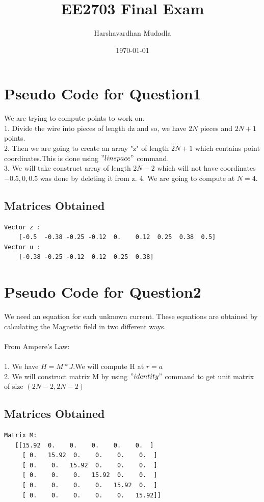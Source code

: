 \documentclass[11pt, a4paper]{article}
\title{EE2703 Final Exam} %
\author{Harshavardhan Mudadla} %
\date{\today} %
\begin{document}
		
		
\maketitle %
\section{Pseudo Code for Question1}
We are trying to compute points to work on.\\
1. Divide the wire into pieces of length dz and so, we have $2N$ pieces and $2N+1$ points.\\
2. Then we are going to create an array "z" of length $2N+1$ which contains point coordinates.This is done using $"linspace"$ command.\\
3. We will take construct array of length $2N-2$ which will not have coordinates $-0.5,0,0.5$ was done by deleting it from z. 
4. We are going to compute at $N = 4$.

\subsection{Matrices Obtained}
\begin{lstlisting}	
Vector z :
    [-0.5  -0.38 -0.25 -0.12  0.    0.12  0.25  0.38  0.5]
Vector u :
    [-0.38 -0.25 -0.12  0.12  0.25  0.38]

\end{lstlisting}

\newpage
\section{Pseudo Code for Question2}
We need an equation for each unknown current. These equations are obtained by
calculating the Magnetic field in two different ways.\\
\\
From Ampere's Law:\\
\\
1. We have $H = M*J$.We will compute H at $r = a$\\
2. We will construct matrix M by using $"identity"$ command to get unit matrix of size $(2N-2,2N-2)$ 
\subsection{Matrices Obtained}
\begin{lstlisting}	
Matrix M:
   [[15.92  0.    0.    0.    0.    0.  ]
     [ 0.   15.92  0.    0.    0.    0.  ]
     [ 0.    0.   15.92  0.    0.    0.  ]
     [ 0.    0.    0.   15.92  0.    0.  ]
     [ 0.    0.    0.    0.   15.92  0.  ]
     [ 0.    0.    0.    0.    0.   15.92]]

\end{lstlisting}
\newpage
\end{document}
